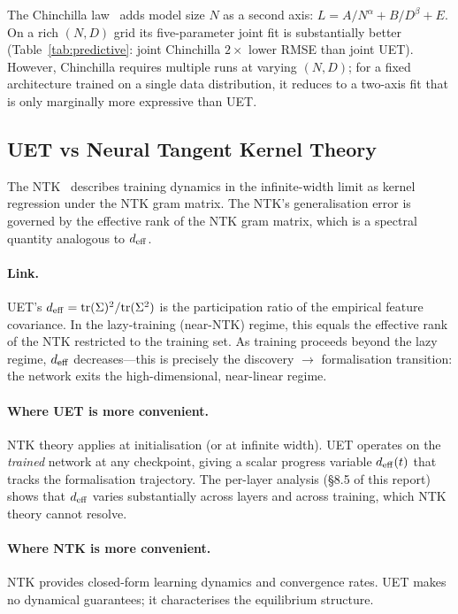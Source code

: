 The Chinchilla law~\citep{hoffmann2022chinchilla} adds model size $N$
as a second axis: $L = A/N^\alpha + B/D^\beta + E$.
On a rich $(N, D)$ grid its five-parameter joint fit is substantially better
(Table~\ref{tab:predictive}: joint Chinchilla $2\times$ lower RMSE than joint UET).
However, Chinchilla requires multiple runs at varying $(N, D)$; for a fixed
architecture trained on a single data distribution, it reduces to a two-axis fit
that is only marginally more expressive than UET.

\subsection{UET vs Neural Tangent Kernel Theory}
\label{sec:vs-ntk}

The NTK~\citep{jacot2018ntk} describes training dynamics in the infinite-width
limit as kernel regression under the NTK gram matrix.
The NTK's generalisation error is governed by the effective rank of the NTK
gram matrix, which is a spectral quantity analogous to $d_{\mathrm{eff}}$.

\paragraph{Link.}
UET's $d_{\mathrm{eff}} = \mathrm{tr}(\Sigma)^2 / \mathrm{tr}(\Sigma^2)$ is the participation ratio of the
empirical feature covariance.
In the lazy-training (near-NTK) regime, this equals the effective rank of the
NTK restricted to the training set.
As training proceeds beyond the lazy regime, $d_{\mathrm{eff}}$ decreases---this is precisely
the discovery $\to$ formalisation transition: the network exits the
high-dimensional, near-linear regime.

\paragraph{Where UET is more convenient.}
NTK theory applies at initialisation (or at infinite width).
UET operates on the \emph{trained} network at any checkpoint, giving a
scalar progress variable $d_{\mathrm{eff}}(t)$ that tracks the formalisation trajectory.
The per-layer analysis (§8.5 of this report) shows that $d_{\mathrm{eff}}$ varies
substantially across layers and across training, which NTK theory cannot resolve.

\paragraph{Where NTK is more convenient.}
NTK provides closed-form learning dynamics and convergence rates.
UET makes no dynamical guarantees; it characterises the equilibrium structure.

